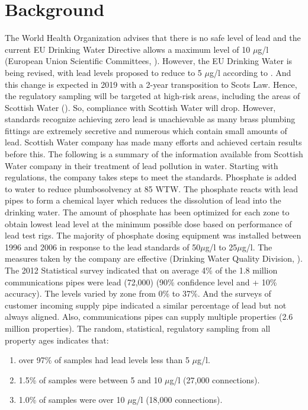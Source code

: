 \documentclass[11pt,twoside]{article}
\numberwithin{Theorem}{section}
\numberwithin{Definition}{section}
\numberwithin{Lemma}{section}
\numberwithin{Algorithm}{section}
\numberwithin{equation}{section}
\begin{document}
\section{Background}
\label{sec:background}
The World Health Organization advises that there is no safe level of lead and the current EU Drinking Water Directive allows a maximum level of 10 $\mu$g/l (European Union Scientific Committees, \citeyear{european}). However, the EU Drinking Water is being revised, with lead levels proposed to reduce to 5 $\mu$g/l according to \cite{aquatech}. And this change is expected in 2019 with a 2-year transposition to Scots Law. Hence, the regulatory sampling will be targeted at high-risk areas, including the areas of Scottish Water (\cite{sw}). So, compliance with Scottish Water will drop. However, standards recognize achieving zero lead is unachievable as many brass plumbing fittings are extremely secretive and numerous which contain small amounts of lead.
Scottish Water company has made many efforts and achieved certain results before this. The following is a summary of the information available from Scottish Water company in their treatment of lead pollution in water.
Starting with regulations, the company takes steps to meet the standards. Phosphate is added to water to reduce plumbosolvency at 85 WTW. The phosphate reacts with lead pipes to form a chemical layer which reduces the dissolution of lead into the drinking water. The amount of phosphate has been optimized for each zone to obtain lowest lead level at the minimum possible dose based on performance of lead test rigs. The majority of phosphate dosing equipment was installed between 1996 and 2006 in response to the lead standards of 50$\mu$g/l to 25$\mu$g/l. The measures taken by the company are effective (Drinking Water Quality Division, \citeyear{drinking}). The 2012 Statistical survey indicated that on average 4\% of the 1.8 million communications pipes were lead (72,000) (90\% confidence level and + 10\% accuracy). The levels varied by zone from 0\% to 37\%. And the surveys of customer incoming supply pipe indicated a similar percentage of lead but not always aligned. Also, communications pipes can supply multiple properties (2.6 million properties). The random, statistical, regulatory sampling from all property ages indicates that:

\begin{enumerate}
\item over 97\% of samples had lead levels less than 5 $\mu$g/l.
\item 1.5\% of samples were between 5 and 10 $\mu$g/l (27,000 connections).
\item 1.0\% of samples were over 10 $\mu$g/l (18,000 connections).
\end{enumerate}
\end{document}
